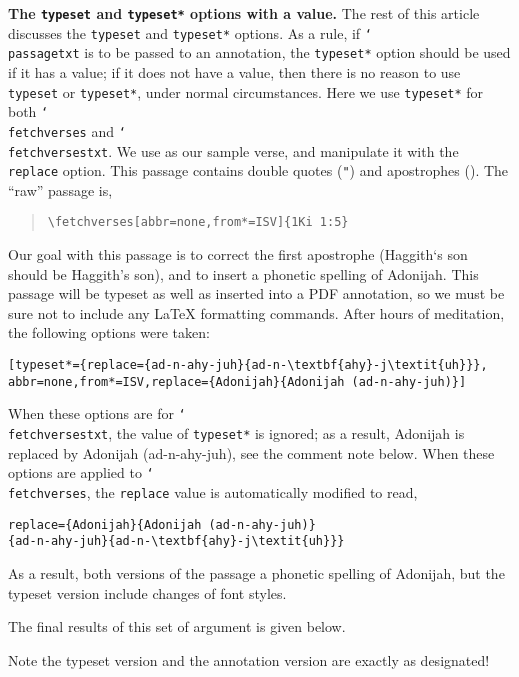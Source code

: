 \documentclass{article}
\def\cs#1{\texttt{\char`\\#1}}
\begin{document}
\medskip\noindent
\textbf{The \texttt{typeset} and \texttt{typeset*} options with a value.} The
rest of this article discusses the \texttt{typeset} and \texttt{typeset*}
options. As a rule, if \cs{passagetxt} is to be passed to an annotation, the
\texttt{typeset*} option should be used if it has a value; if it does not
have a value, then there is no reason to use \texttt{typeset} or
\texttt{typeset*}, under normal circumstances. Here we use \texttt{typeset*}
for both \cs{fetchverses} and \cs{fetchversestxt}. We
use \versetxt\space as our sample verse, and manipulate it
with the \texttt{replace}
option.\pdfmargincomment[author={\versetxt}]{\passagetxt} This passage
contains double quotes (\texttt{"}) and apostrophes (\texttt{}). The ``raw'' passage is,
\begin{quote}
\verb~\fetchverses[abbr=none,from*=ISV]{1Ki 1:5}~\\[3pt]
\end{quote}
Our goal with this passage is to correct the first apostrophe (Haggith`s son
should be Haggith's son), and to insert a phonetic spelling of Adonijah. This passage
will be typeset as well as inserted into a PDF annotation, so we must be sure not to
include any {\LaTeX} formatting commands. After hours of meditation, the following options
were taken:
\begin{fpquote}[rightmargin=0pt]\small
\verb~[typeset*={replace={ad-n-ahy-juh}{ad-n-\textbf{ahy}-j\textit{uh}}},~\\
\verb~abbr=none,from*=ISV,replace={Adonijah}{Adonijah (ad-n-ahy-juh)}]~
\end{fpquote}
When these options are for \cs{fetchversestxt}, the value of
\texttt{typeset*} is ignored; as a result, Adonijah is replaced by Adonijah
(ad-n-ahy-juh), see the comment note below. When these options are applied to
\cs{fetchverses}, the \texttt{replace} value is automatically modified to
read,
\begin{fpquote}[rightmargin=0pt]
\verb~replace={Adonijah}{Adonijah (ad-n-ahy-juh)}~\\
\qquad\verb~{ad-n-ahy-juh}{ad-n-\textbf{ahy}-j\textit{uh}}}~
\end{fpquote}
As a result, both versions of the passage a phonetic spelling of Adonijah, but the typeset version include changes of
font styles.

\medskip
The final results of this set of argument is given below.
\begin{quote}
\bDQ\eSQ{}\pdfmargincomment[author={\versetxt}]{\passagetxt}
\end{quote}
Note the typeset version and the annotation version are exactly as designated!
\end{document}
